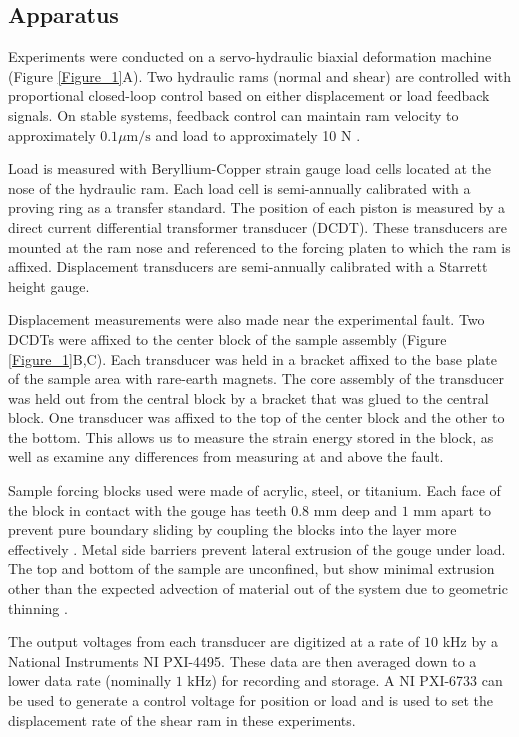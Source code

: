 \subsection{Apparatus}
Experiments were conducted on a servo-hydraulic biaxial deformation machine \cite{Karner:2000tj,Frye:2002jj,leeman2015stiffness} (Figure \ref{Figure_1}A). Two hydraulic rams (normal and shear) are controlled with proportional closed-loop control based on either displacement or load feedback signals. On stable systems, feedback control can maintain ram velocity to approximately $0.1 \mu\text{m/s}$ and load to approximately 10 N \cite{Hong:2005gd,Rathbun:2008ks}.

Load is measured with Beryllium-Copper strain gauge load cells located at the nose of the hydraulic ram. Each load cell is semi-annually calibrated with a proving ring as a transfer standard. The position of each piston is measured by a direct current differential transformer transducer (DCDT). These transducers are mounted at the ram nose and referenced to the forcing platen to which the ram is affixed. Displacement transducers are semi-annually calibrated with a Starrett height gauge.

Displacement measurements were also made near the experimental fault. Two DCDTs were affixed to the center block of the sample assembly (Figure \ref{Figure_1}B,C). Each transducer was held in a bracket affixed to the base plate of the sample area with rare-earth magnets. The core assembly of the transducer was held out from the central block by a bracket that was glued to the central block. One transducer was affixed to the top of the center block and the other to the bottom. This allows us to measure the strain energy stored in the block, as well as examine any differences from measuring at and above the fault.

Sample forcing blocks used were made of acrylic, steel, or titanium. Each face of the block in contact with the gouge has teeth $0.8$ mm deep and $1$ mm apart to prevent pure boundary sliding by coupling the blocks into the layer more effectively \cite{Anthony:2005jo,Knuth:2007ci}. Metal side barriers prevent lateral extrusion of the gouge under load. The top and bottom of the sample are unconfined, but show minimal extrusion other than the expected advection of material out of the system due to geometric thinning \cite{scott1994apparent}.

The output voltages from each transducer are digitized at a rate of $10$ kHz by a National Instruments NI PXI-4495. These data are then averaged down to a lower data rate (nominally $1$ kHz) for recording and storage. A NI PXI-6733 can be used to generate a control voltage for position or load and is used to set the displacement rate of the shear ram in these experiments.

